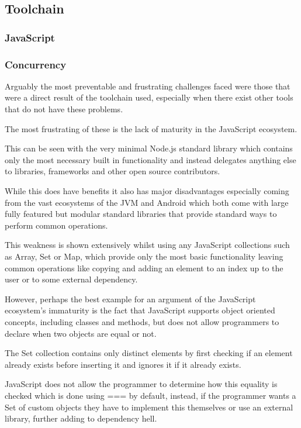 \documentclass[12pt]{article}
\newcommand{\sentence}{} %
\begin{document}
    \subsection{Toolchain}\label{subsec:toolchain2}


    \subsubsection{JavaScript}\label{subsubsec:javascript}

    \subsubsection{Concurrency}\label{subsubsec:concurrency}

    \tab
    Arguably the most preventable and frustrating challenges faced were those that were a direct result of the
    toolchain used, especially when there exist other tools that do not have these problems.
    \sentence
    The most frustrating of these is the lack of maturity in the JavaScript ecosystem.
    \sentence
    This can be seen with the very minimal Node.js standard library which contains only the most necessary built in
    functionality and instead delegates anything else to libraries, frameworks and other open source contributors.
    \sentence
    While this does have benefits it also has major disadvantages especially coming from the vast ecosystems of the
    JVM and Android which both come with large fully featured but modular standard libraries that provide standard
    ways to perform common operations.
    \sentence
    This weakness is shown extensively whilst using any JavaScript collections such as Array, Set or Map, which
    provide only the most basic functionality leaving common operations like copying and adding an element to an
    index up to the user or to some external dependency.
    \sentence
    However, perhaps the best example for an argument of the JavaScript ecosystem's immaturity is the fact that
    JavaScript supports object oriented concepts, including classes and methods, but does not allow programmers to
    declare when two objects are equal or not.
    \sentence
    The Set collection contains only distinct elements by first checking if an element already exists before
    inserting it and ignores it if it already exists.
    \sentence
    JavaScript does not allow the programmer to determine how this equality is checked which is done using === by
    default, instead, if the programmer wants a Set of custom objects they have to implement this themselves or
    use an external library, further adding to dependency hell.
\end{document}
